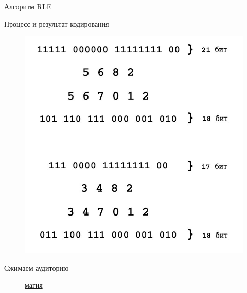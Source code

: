 \documentclass[11pt]{beamer}
\begin{document}
\begin{frame}{Алгоритм RLE}
\begin{block}{Процесс и результат кодирования}
\begin{figure}[H]
	\begin{center}
		\includegraphics[scale=0.25]{../pics/RLE/example.jpg}
	\end{center}
\end{figure}	
\end{block}				
\end{frame} 



\begin{frame}{Сжимаем аудиторию}
\begin{figure}[H]
	\begin{center}
		\huge\href{http://octo.ejiek.com/job/image_compression_algorithms/}{магия}
	\end{center}
\end{figure}					
\end{frame} 
\end{document}
